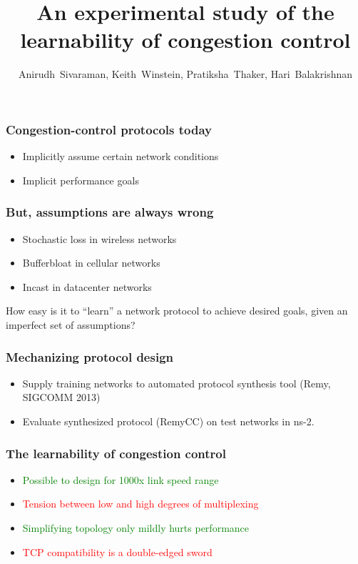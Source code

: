 \documentclass[svgnames]{beamer}
\title{An experimental study of the learnability of congestion control}
\author{Anirudh~Sivaraman, Keith~Winstein, Pratiksha~Thaker, Hari~Balakrishnan}
\institute{MIT CSAIL\vspace{\baselineskip}}
\begin{document}
\begin{frame}

\titlepage

\end{frame}

\begin{Large}
\begin{frame}
\frametitle{Congestion-control protocols today}
\begin{itemize}
\item<2-> Implicitly assume certain network conditions
\item<3-> Implicit performance goals
\end{itemize}
\end{frame}

\begin{frame}
\frametitle{But, assumptions are always wrong}
\begin{itemize}
\item<2-> Stochastic loss in wireless networks
\item<3-> Bufferbloat in cellular networks
\item<4-> Incast in datacenter networks
\end{itemize}
\end{frame}

\begin{frame}
\begin{center}
How easy is it to “learn” a network protocol to achieve desired goals, given
an imperfect set of assumptions?
\end{center}
\end{frame}

\begin{frame}
\frametitle{Mechanizing protocol design}
\begin{itemize}
\item <2->Supply training networks to automated protocol synthesis tool (Remy, SIGCOMM 2013) 
\item <3->Evaluate synthesized protocol (RemyCC) on test networks in ns-2.
\end{itemize}
\end{frame}







 



\begin{frame}
\frametitle{The learnability of congestion control}
\begin{itemize}
\item<1-> \textcolor{green}{Possible to design for 1000x link speed range}
\item<2-> \textcolor{red}{Tension between low and high degrees of multiplexing}
\item<3-> \textcolor{green}{Simplifying topology only mildly hurts performance}
\item<4-> \textcolor{red}{TCP compatibility is a double-edged sword}
\end{itemize}
\end{frame}


\end{Large}
\end{document}
